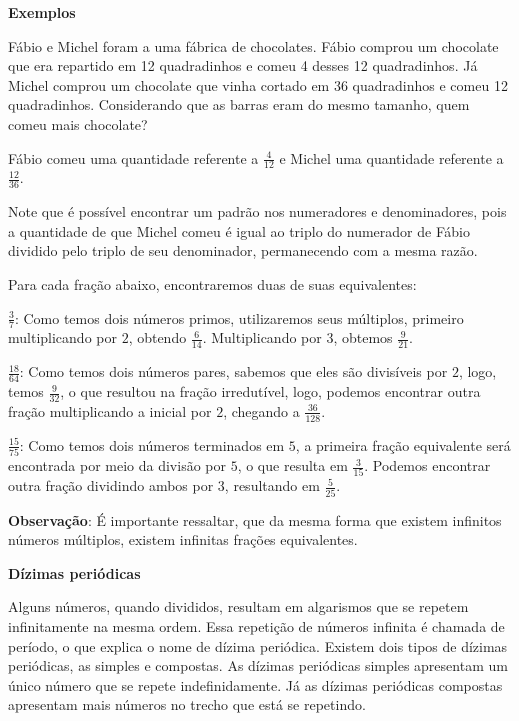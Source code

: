 \textbf{Exemplos}

  Fábio e Michel foram a uma fábrica de chocolates. Fábio comprou um
  chocolate que era repartido em 12 quadradinhos e comeu 4 desses 12
  quadradinhos. Já Michel comprou um chocolate que vinha cortado em 36
  quadradinhos e comeu 12 quadradinhos. Considerando que as barras eram
  do mesmo tamanho, quem comeu mais chocolate?

Fábio comeu uma quantidade referente a $\frac{4}{12}$ e Michel uma
quantidade referente a $\frac{12}{36}$.

Note que é possível encontrar um padrão nos numeradores e denominadores,
pois a quantidade de que Michel comeu é igual ao triplo do numerador de
Fábio dividido pelo triplo de seu denominador, permanecendo com a mesma
razão.

Para cada fração abaixo, encontraremos duas de suas equivalentes:

$\frac{3}{7}$: Como temos dois números primos, utilizaremos seus
múltiplos, primeiro multiplicando por $2$, obtendo $\frac{6}{14}$.
Multiplicando por $3$, obtemos $\frac{9}{21}$.

$\frac{18}{64}$: Como temos dois números pares, sabemos que eles são
divisíveis por $2$, logo, temos $\frac{9}{32}$, o que resultou na fração
irredutível, logo, podemos encontrar outra fração multiplicando a
inicial por $2$, chegando a $\frac{36}{128}$.

$\frac{15}{75}$: Como temos dois números terminados em $5$, a primeira
fração equivalente será encontrada por meio da divisão por $5$, o que
resulta em $\frac{3}{15}$. Podemos encontrar outra fração dividindo
ambos por $3$, resultando em $\frac{5}{25}$.

\textbf{Observação}: É importante ressaltar, que da mesma forma que
existem infinitos números múltiplos, existem infinitas frações
equivalentes.

\textbf{Dízimas periódicas}


Alguns números, quando divididos, resultam em algarismos que se repetem
infinitamente na mesma ordem. Essa repetição de números infinita é
chamada de período, o que explica o nome de dízima periódica. Existem
dois tipos de dízimas periódicas, as simples e compostas. As dízimas
periódicas simples apresentam um único número que se repete
indefinidamente. Já as dízimas periódicas compostas apresentam mais
números no trecho que está se repetindo.

